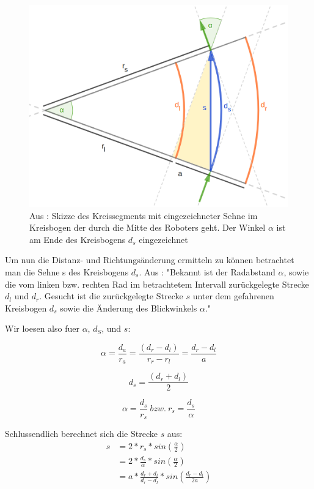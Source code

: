 \documentclass[11pt,a4paper]{article}
\begin{document}
\begin{figure}[ht]
  \centering
  \includegraphics[width = 12cm]{richtungsaenderung.png}
  \caption{Aus \cite{website:dresden}: Skizze des Kreissegments mit eingezeichneter Sehne im Kreisbogen der durch die Mitte des Roboters geht. Der Winkel $\alpha$ ist am Ende
  des Kreisbogens $d_s$ eingezeichnet}
  \label{fig: Richtungsaenderung}
\end{figure}

Um nun die Distanz- und Richtungsänderung ermitteln zu können betrachtet man die Sehne s des Kreisbogens $d_s$. Aus \cite{website:dresden}:
"Bekannt ist der Radabstand $\alpha$, sowie die vom linken bzw. rechten Rad im betrachtetem Intervall zurückgelegte Strecke $d_l$ und $d_r$. Gesucht 
ist die zurückgelegte Strecke $s$ unter dem gefahrenen Kreisbogen $d_s$ sowie die Änderung des Blickwinkels $\alpha$."

Wir loesen also fuer $\alpha$, $d_S$, und $s$: 

\begin{equation}
  \alpha = \frac{d_a}{r_a} = \frac{(d_r - d_l)}{r_r - r_l} = \frac{d_r - d_l}{a}
\end{equation}

\begin{equation}
  d_s = \frac{(d_r + d_l)}{2}
\end{equation}

\begin{equation}
  \alpha =  \frac{d_s}{r_s}~bzw.~ r_s = \frac{d_s}{\alpha}
\end{equation}

Schlussendlich berechnet sich die Strecke $s$ aus:
\begin{align}
  s & = 2 * r_s * sin(\frac{\alpha}{2}) \\
  & = 2 * \frac{d_s}{\alpha}* sin(\frac{\alpha}{2}) \\
  & = a * \frac{d_r + d_l}{d_r - d_l} * sin(\frac{d_r - d_l}{2a})
\end{align}
\end{document}
